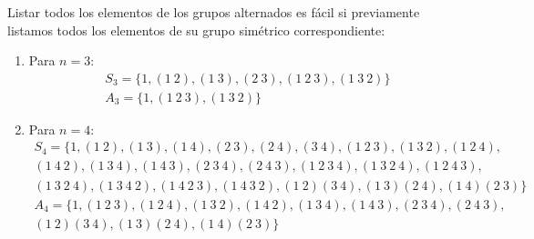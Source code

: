 \begin{ejemplo}
    Listar todos los elementos de los grupos alternados es fácil si previamente listamos todos los elementos de su grupo simétrico correspondiente:
    \begin{enumerate}
        \item Para $n=3$:
        \begin{gather*}
            S_3 = \{1, (1\ 2), (1\ 3), (2\ 3), (1\ 2\ 3), (1\ 3\ 2)\} \\
            A_3 = \{1, (1\ 2\ 3), (1\ 3\ 2)\}
        \end{gather*}
        \item Para $n=4$:
            \begin{multline*}
                S_4 = \{1, (1\ 2), (1\ 3), (1\ 4), (2\ 3), (2\ 4), (3\ 4), (1\ 2\ 3), (1\ 3\ 2), (1\ 2\ 4), \\
                    (1\ 4\ 2), (1\ 3\ 4), (1\ 4\ 3), (2\ 3\ 4), (2\ 4\ 3), (1\ 2\ 3\ 4), (1\ 3\ 2\ 4), (1\ 2\ 4\ 3), \\
                (1\ 3\ 2\ 4), (1\ 3\ 4\ 2), (1\ 4\ 2\ 3), (1\ 4\ 3\ 2), (1\ 2)(3\ 4), (1\ 3)(2\ 4), (1\ 4)(2\ 3)\}
            \end{multline*}
            \begin{multline*}
                A_4 = \{1, (1\ 2\ 3), (1\ 2\ 4), (1\ 3\ 2), (1\ 4\ 2), (1\ 3\ 4), (1\ 4\ 3), (2\ 3\ 4), (2\ 4\ 3), \\
                (1\ 2)(3\ 4), (1\ 3)(2\ 4), (1\ 4)(2\ 3)\}
            \end{multline*}
    \end{enumerate}
\end{ejemplo}

